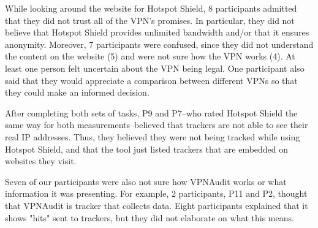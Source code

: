 While looking around the website for Hotspot Shield, 8 participants admitted that they did not trust all of the VPN's promises. In particular, they did not believe
that Hotspot Shield provides unlimited bandwidth and/or that it ensures anonymity.
Moreover, 7 participants were confused, since they did not understand the content
on the website (5) and were not sure how the VPN works (4). At least one person
felt uncertain about the VPN being legal. One participant also said that
they would appreciate a comparison between different VPNs so that they could make an
informed decision.

After completing both sets of tasks, P9 and P7--who rated Hotspot Shield the same way for both measurements--believed that trackers are not able to see their real IP
addresses. Thus, they believed they were not being tracked while using Hotspot Shield, and that the tool just listed trackers that are embedded on websites they visit. 

Seven of our participants were also not sure how VPNAudit works or what
information it was presenting. For example, 2 participants, P11 and P2,
thought that VPNAudit is tracker that collects data. Eight participants
explained that it shows "hits" sent to trackers, but they did not elaborate on what this means. 
